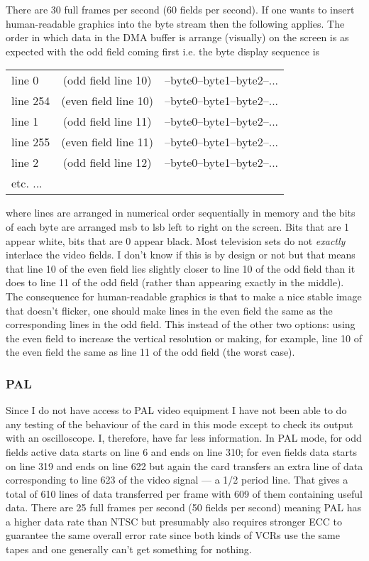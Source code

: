 \documentclass{article}
\begin{document}
There are 30 full frames per second (60 fields per second).  If one wants
to insert human-readable graphics into the byte stream then the following
applies.  The order in which data in the DMA buffer is arrange (visually)
on the screen is as expected with the odd field coming first i.e. the byte
display sequence is
\begin{center}
\begin{tabular}[t]{lcl}
line 0   & (odd  field line 10) & --byte0--byte1--byte2--... \\
line 254 & (even field line 10) & --byte0--byte1--byte2--... \\
line 1   & (odd  field line 11) & --byte0--byte1--byte2--... \\
line 255 & (even field line 11) & --byte0--byte1--byte2--... \\
line 2   & (odd  field line 12) & --byte0--byte1--byte2--... \\
etc. ... &&
\end{tabular}
\end{center}
where lines are arranged in numerical order sequentially in memory and the
bits of each byte are arranged msb to lsb left to right on the screen.  
Bits that are 1 appear white, bits that are 0 appear black.  Most
television sets do not \emph{exactly} interlace the video fields.  I don't
know if this is by design or not but that means that line 10 of the even
field lies slightly closer to line 10 of the odd field than it does to
line 11 of the odd field (rather than appearing exactly in the middle).
The consequence for human-readable graphics is that to make a nice stable
image that doesn't flicker, one should make lines in the even field the
same as the corresponding lines in the odd field.  This instead of the
other two options:  using the even field to increase the vertical
resolution or making, for example, line 10 of the even field the same as
line 11 of the odd field (the worst case).

\subsubsection{PAL}

Since I do not have access to PAL video equipment I have not been able to
do any testing of the behaviour of the card in this mode except to check
its output with an oscilloscope.  I, therefore, have far less information.  
In PAL mode, for odd fields active data starts on line 6 and ends on line
310; for even fields data starts on line 319 and ends on line 622 but
again the card transfers an extra line of data corresponding to line 623
of the video signal --- a 1/2 period line.  That gives a total of 610
lines of data transferred per frame with 609 of them containing useful
data.  There are 25 full frames per second (50 fields per second) meaning
PAL has a higher data rate than NTSC but presumably also requires stronger
ECC to guarantee the same overall error rate since both kinds of VCRs use
the same tapes and one generally can't get something for nothing.
\end{document}
